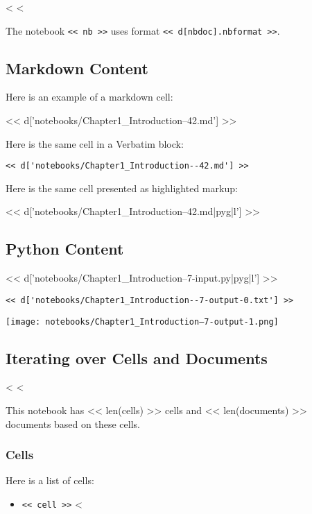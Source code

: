 \documentclass[12pt]{article}
\begin{document}
<%
<%

The notebook \verb|<< nb >>| uses format \verb|<< d[nbdoc].nbformat >>|.

\subsection*{Markdown Content}

Here is an example of a markdown cell:

<< d['notebooks/Chapter1_Introduction--42.md'] >>

Here is the same cell in a Verbatim block:

\begin{Verbatim}
<< d['notebooks/Chapter1_Introduction--42.md'] >>
\end{Verbatim}

Here is the same cell presented as highlighted markup:

<< d['notebooks/Chapter1_Introduction--42.md|pyg|l'] >>

\subsection*{Python Content}

<< d['notebooks/Chapter1_Introduction--7-input.py|pyg|l'] >>

\begin{Verbatim}
<< d['notebooks/Chapter1_Introduction--7-output-0.txt'] >>
\end{Verbatim}

\texttt{[image: notebooks/Chapter1\_Introduction--7-output-1.png]}

\subsection*{Iterating over Cells and Documents}

<%
<%

This notebook has << len(cells) >> cells and << len(documents) >> documents based on these cells.

\subsubsection*{Cells}

Here is a list of cells:

\begin{itemize}
<%
\item{\verb|<< cell >>|}
<%
\end{itemize}
\end{document}

